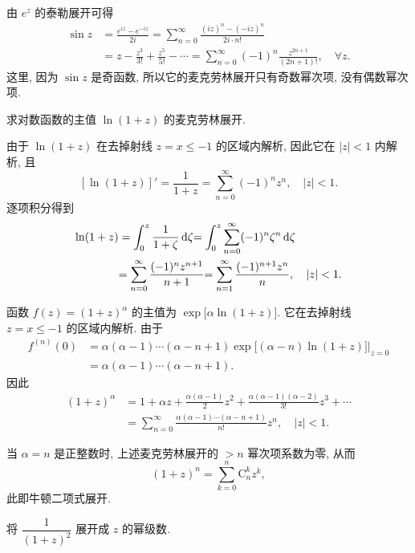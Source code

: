 \begin{example}
	由 $e^z$ 的泰勒展开可得
	\begin{align*}
		\sin z&=\frac{e^{iz}-e^{-iz}}{2i}
		{=\sum_{n=0}^\infty\frac{(iz)^n-(-iz)^n}{2i\cdot n!}}\\
		&=z-\frac{z^3}{3!}+\frac{z^5}{5!}-\cdots
		=\sum_{n=0}^\infty(-1)^n\frac{z^{2n+1}}{(2n+1)!},\quad\forall z.
	\end{align*}
		这里, 因为 $\sin z$ 是奇函数, 所以它的麦克劳林展开只有奇数幂次项, 没有偶数幂次项.
\end{example}

\begin{example}
求对数函数的主值 $\ln(1+z)$ 的麦克劳林展开.
\end{example}
\begin{solution}
由于 $\ln(1+z)$ 在去掉射线 $z=x\le-1$ 的区域内解析,
{因此它在 $|z|<1$ 内解析,
}{且
	\[[\ln(1+z)]'=\frac1{1+z}=\sum_{n=0}^\infty(-1)^nz^n,\quad|z|<1.\]
}{逐项积分得到
\begin{align*}
\ln(1+z)&=\int_0^z\frac1{1+\zeta}\,\mathrm{d}\zeta
	{=\int_0^z\sum_{n=0}^\infty(-1)^n\zeta^n\,\mathrm{d}\zeta}\\
&{=\sum_{n=0}^\infty\frac{(-1)^nz^{n+1}}{n+1}}
	{=\sum_{n=1}^\infty\frac{(-1)^{n+1}z^n}{n},\quad|z|<1.}
\end{align*}}
\end{solution}

\begin{example}
	函数 $f(z)=(1+z)^\alpha$ 的主值为 $\exp\bigl[\alpha\ln(1+z)\bigr]$. 它在去掉射线 $z=x\le -1$ 的区域内解析. 由于
	\begin{align*}
		f^{(n)}(0)&=\alpha(\alpha-1)\cdots(\alpha-n+1)\exp\bigl[(\alpha-n)\ln(1+z)\bigr]\Big|_{z=0}\\
		&=\alpha(\alpha-1)\cdots(\alpha-n+1).
	\end{align*}
	因此
	\begin{align*}
		(1+z)^\alpha&=1+\alpha z+\frac{\alpha(\alpha-1)}2z^2+\frac{\alpha(\alpha-1)(\alpha-2)}{3!}z^3+\cdots\\
		&=\sum_{n=0}^\infty\frac{\alpha(\alpha-1)\cdots(\alpha-n+1)}{n!}z^n,\quad |z|<1.
	\end{align*}
\end{example}

当 $\alpha=n$ 是正整数时, 上述麦克劳林展开的 $>n$ 幂次项系数为零, 
从而
	\[(1+z)^n=\sum_{k=0}^n \mathrm{C}_n^k z^k,\]
此即牛顿二项式展开.

\begin{example}
	将 $\dfrac1{(1+z)^2}$ 展开成 $z$ 的幂级数.
\end{example}

